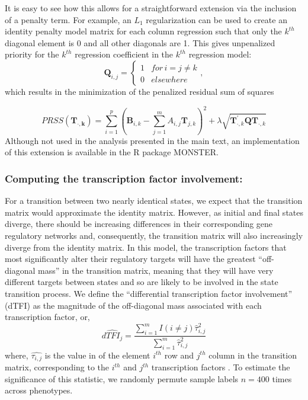 It is easy to see how this allows for a straightforward extension via the inclusion of a penalty term. For example, an $L_{1}$ regularization\cite{tibshirani1996regression} can be used to create an identity penalty model matrix for each column regression such that only the $k^{th}$ diagonal element is 0 and all other diagonals are 1. This gives unpenalized priority for the $k^{th}$ regression coefficient in the $k^{th}$ regression model: 
\[
\mathbf{Q}_{i,j}=\begin{cases}
1 & for\,i=j\ne k\\
0 & elsewhere
\end{cases},
\]
which results in the minimization of the penalized residual sum of squares

\[
PRSS\left(\boldsymbol{\mathbf{T}_{\cdot,k}}\right)=\sum_{i=1}^{p}\left(\mathbf{B}_{i,k}-\sum_{j=1}^{m}A_{i,j}\mathbf{T}_{j,k}\right)^{2}+\lambda\sqrt{\mathbf{T}_{\cdot,k}^{\prime}\boldsymbol{Q}\mathbf{T}_{\cdot,k}}
\]
Although not used in the analysis presented in the main text, an implementation of this extension is available in the R package MONSTER.

\subsubsection*{Computing the transcription factor involvement:} For a transition between two nearly identical states, we expect that the transition matrix would approximate the identity matrix. However, as initial and final states diverge, there should be increasing differences in their corresponding gene regulatory networks and, consequently, the transition matrix will also increasingly diverge from the identity matrix. In this model, the transcription factors that most significantly alter their regulatory targets will have the greatest ``off-diagonal mass'' in the transition matrix, meaning that they will have very different targets between states and so are likely to be involved in the state transition process. We define the ``differential transcription factor involvement'' (dTFI) as the magnitude of the off-diagonal mass associated with each transcription factor, or, 
\begin{equation}
\hat{dTFI_{j}}=\frac{\sum_{i=1}^{m}I\left(i\ne j\right)\hat{\tau}_{i,j}^{2}}{\sum_{i=1}^{m}\hat{\tau}_{i,j}^{2}}\label{eq:dTFI}
\end{equation}
where, $\hat{\tau_{i,j}}$ is the value in of the element $i^{th}$ row and $j^{th}$ column in the transition matrix, corresponding to the $i^{th}$ and $j^{th}$ transcription factors . To estimate the significance of this statistic, we randomly permute sample labels $n=400$ times across phenotypes.


